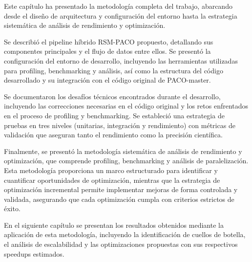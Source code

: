 Este capítulo ha presentado la metodología completa del trabajo, abarcando desde el diseño de arquitectura y configuración del entorno hasta la estrategia sistemática de análisis de rendimiento y optimización. 

Se describió el pipeline híbrido RSM-PACO propuesto, detallando sus componentes principales y el flujo de datos entre ellos. Se presentó la configuración del entorno de desarrollo, incluyendo las herramientas utilizadas para profiling, benchmarking y análisis, así como la estructura del código desarrollado y su integración con el código original de PACO-master.

Se documentaron los desafíos técnicos encontrados durante el desarrollo, incluyendo las correcciones necesarias en el código original y los retos enfrentados en el proceso de profiling y benchmarking. Se estableció una estrategia de pruebas en tres niveles (unitarias, integración y rendimiento) con métricas de validación que aseguran tanto el rendimiento como la precisión científica.

Finalmente, se presentó la metodología sistemática de análisis de rendimiento y optimización, que comprende profiling, benchmarking y análisis de paralelización. Esta metodología proporciona un marco estructurado para identificar y cuantificar oportunidades de optimización, mientras que la estrategia de optimización incremental permite implementar mejoras de forma controlada y validada, asegurando que cada optimización cumpla con criterios estrictos de éxito.

En el siguiente capítulo se presentan los resultados obtenidos mediante la aplicación de esta metodología, incluyendo la identificación de cuellos de botella, el análisis de escalabilidad y las optimizaciones propuestas con sus respectivos speedups estimados.